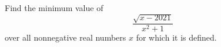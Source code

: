 Find the minimum value of
\[\dfrac{\sqrt{x-2021}}{x^2+1}\]
over all nonnegative real numbers $x$ for which it is defined.

